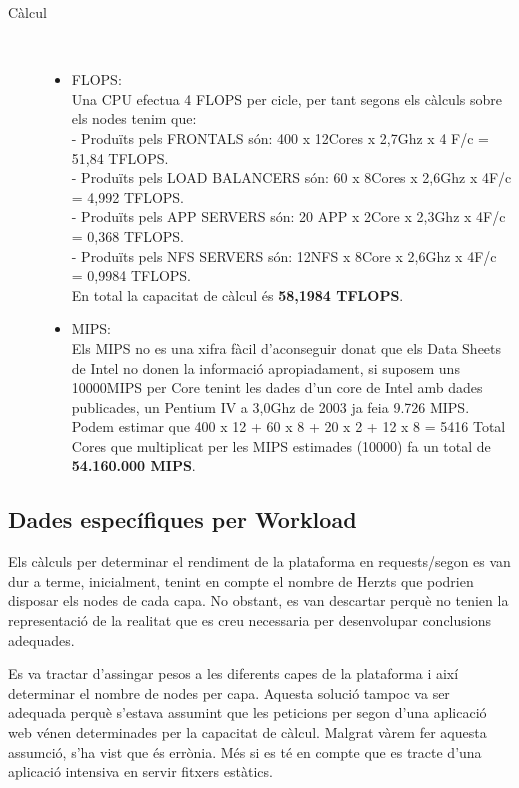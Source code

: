 \begin{description}
    \item[Càlcul] \hfill \\
        \vspace{-5mm}
        \begin{itemize}[leftmargin=*]
            \item FLOPS: \\
            Una CPU efectua 4 FLOPS per cicle, per tant segons els càlculs sobre els nodes tenim que:\\
            - Produïts pels FRONTALS són: 400 x 12Cores x 2,7Ghz x 4 F/c = 51,84 TFLOPS.\\
            - Produïts pels LOAD BALANCERS són: 60 x 8Cores x 2,6Ghz x 4F/c = 4,992 TFLOPS.\\
            - Produïts pels APP SERVERS són: 20 APP x 2Core x 2,3Ghz x 4F/c = 0,368 TFLOPS.\\
            - Produïts pels NFS SERVERS són: 12NFS x 8Core x 2,6Ghz x 4F/c = 0,9984 TFLOPS.\\
            En total la capacitat de càlcul és \textbf{58,1984 TFLOPS}.
            \item MIPS: \\
            Els MIPS no es una xifra fàcil d'aconseguir donat que els Data Sheets de Intel no donen la informació apropiadament, si suposem uns 10000MIPS per Core tenint les dades d'un core de Intel amb dades publicades, un Pentium IV a 3,0Ghz de 2003 ja feia 9.726 MIPS. Podem estimar que 400 x 12 + 60 x 8 + 20 x 2 + 12 x 8 = 5416 Total Cores que multiplicat per les MIPS estimades (10000) fa un total de \textbf{54.160.000 MIPS}.
        \end{itemize}

\end{description}

\subsection{Dades específiques per Workload}


Els càlculs per determinar el rendiment de la plataforma en requests/segon es van dur a terme, inicialment, tenint en compte el nombre de Herzts que podrien disposar els nodes de cada capa. No obstant, es van descartar perquè no tenien la representació de la realitat que es creu necessaria per desenvolupar conclusions adequades. 

Es va tractar d'assingar pesos a les diferents capes de la plataforma i així determinar el nombre de nodes per capa. Aquesta solució tampoc va ser adequada perquè s'estava assumint que les peticions per segon d'una aplicació web vénen determinades per la capacitat de càlcul. Malgrat vàrem fer aquesta assumció, s'ha vist que és errònia. Més si es té en compte que es tracte d'una aplicació intensiva en servir fitxers estàtics.


